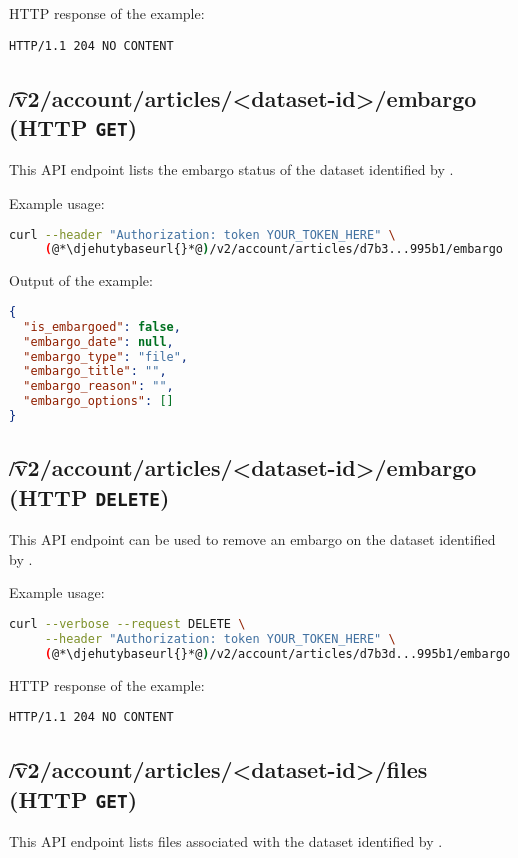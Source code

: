   HTTP response of the example:
\begin{lstlisting}
HTTP/1.1 204 NO CONTENT
\end{lstlisting}

\subsection{\t{/v2/account/articles/<dataset-id>/embargo} (HTTP \texttt{GET})}

  This API endpoint lists the embargo status of the dataset identified by .

  Example usage:
\begin{lstlisting}[language=bash]
curl --header "Authorization: token YOUR_TOKEN_HERE" \
     (@*\djehutybaseurl{}*@)/v2/account/articles/d7b3...995b1/embargo | jq
\end{lstlisting}

  Output of the example:
\begin{lstlisting}[language=JSON]
{
  "is_embargoed": false,
  "embargo_date": null,
  "embargo_type": "file",
  "embargo_title": "",
  "embargo_reason": "",
  "embargo_options": []
}
\end{lstlisting}

\subsection{\t{/v2/account/articles/<dataset-id>/embargo} (HTTP \texttt{DELETE})}

  This API endpoint can be used to remove an embargo on the dataset
  identified by \code{dataset-id}.

  Example usage:
\begin{lstlisting}[language=bash]
curl --verbose --request DELETE \
     --header "Authorization: token YOUR_TOKEN_HERE" \
     (@*\djehutybaseurl{}*@)/v2/account/articles/d7b3d...995b1/embargo
\end{lstlisting}

  HTTP response of the example:
\begin{lstlisting}
HTTP/1.1 204 NO CONTENT
\end{lstlisting}

\subsection{\t{/v2/account/articles/<dataset-id>/files} (HTTP \texttt{GET})}

  This API endpoint lists files associated with the dataset identified by
  \code{dataset-id}.

